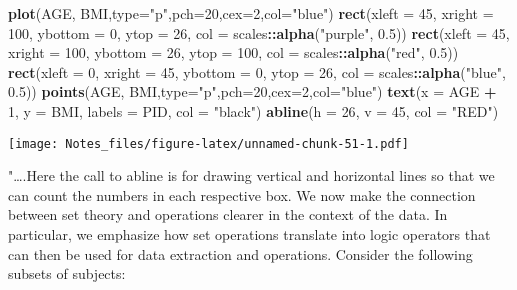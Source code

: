 \documentclass[]{article}
\newenvironment{Shaded}{\begin{snugshade}}{\end{snugshade}}
\newcommand{\DataTypeTok}[1]{\textcolor[rgb]{0.13,0.29,0.53}{#1}}
\newcommand{\DecValTok}[1]{\textcolor[rgb]{0.00,0.00,0.81}{#1}}
\newcommand{\FloatTok}[1]{\textcolor[rgb]{0.00,0.00,0.81}{#1}}
\newcommand{\KeywordTok}[1]{\textcolor[rgb]{0.13,0.29,0.53}{\textbf{#1}}}
\newcommand{\NormalTok}[1]{#1}
\newcommand{\OperatorTok}[1]{\textcolor[rgb]{0.81,0.36,0.00}{\textbf{#1}}}
\newcommand{\StringTok}[1]{\textcolor[rgb]{0.31,0.60,0.02}{#1}}
\begin{document}
\begin{Shaded}
\begin{Highlighting}[]
\KeywordTok{plot}\NormalTok{(AGE, BMI,}\DataTypeTok{type=}\StringTok{"p"}\NormalTok{,}\DataTypeTok{pch=}\DecValTok{20}\NormalTok{,}\DataTypeTok{cex=}\DecValTok{2}\NormalTok{,}\DataTypeTok{col=}\StringTok{"blue"}\NormalTok{) }
\KeywordTok{rect}\NormalTok{(}\DataTypeTok{xleft =} \DecValTok{45}\NormalTok{, }\DataTypeTok{xright =} \DecValTok{100}\NormalTok{, }\DataTypeTok{ybottom =} \DecValTok{0}\NormalTok{, }\DataTypeTok{ytop =} \DecValTok{26}\NormalTok{, }\DataTypeTok{col =}\NormalTok{ scales}\OperatorTok{::}\KeywordTok{alpha}\NormalTok{(}\StringTok{"purple"}\NormalTok{, }\FloatTok{0.5}\NormalTok{)) }
\KeywordTok{rect}\NormalTok{(}\DataTypeTok{xleft =} \DecValTok{45}\NormalTok{, }\DataTypeTok{xright =} \DecValTok{100}\NormalTok{, }\DataTypeTok{ybottom =} \DecValTok{26}\NormalTok{, }\DataTypeTok{ytop =} \DecValTok{100}\NormalTok{, }\DataTypeTok{col =}\NormalTok{ scales}\OperatorTok{::}\KeywordTok{alpha}\NormalTok{(}\StringTok{"red"}\NormalTok{, }\FloatTok{0.5}\NormalTok{)) }
\KeywordTok{rect}\NormalTok{(}\DataTypeTok{xleft =} \DecValTok{0}\NormalTok{, }\DataTypeTok{xright =} \DecValTok{45}\NormalTok{, }\DataTypeTok{ybottom =} \DecValTok{0}\NormalTok{, }\DataTypeTok{ytop =} \DecValTok{26}\NormalTok{, }\DataTypeTok{col =}\NormalTok{ scales}\OperatorTok{::}\KeywordTok{alpha}\NormalTok{(}\StringTok{"blue"}\NormalTok{, }\FloatTok{0.5}\NormalTok{)) }
\KeywordTok{points}\NormalTok{(AGE, BMI,}\DataTypeTok{type=}\StringTok{"p"}\NormalTok{,}\DataTypeTok{pch=}\DecValTok{20}\NormalTok{,}\DataTypeTok{cex=}\DecValTok{2}\NormalTok{,}\DataTypeTok{col=}\StringTok{"blue"}\NormalTok{) }
\KeywordTok{text}\NormalTok{(}\DataTypeTok{x =}\NormalTok{ AGE }\OperatorTok{+}\StringTok{ }\DecValTok{1}\NormalTok{, }\DataTypeTok{y =}\NormalTok{ BMI, }\DataTypeTok{labels =}\NormalTok{ PID, }\DataTypeTok{col =} \StringTok{"black"}\NormalTok{) }
\KeywordTok{abline}\NormalTok{(}\DataTypeTok{h =} \DecValTok{26}\NormalTok{, }\DataTypeTok{v =} \DecValTok{45}\NormalTok{, }\DataTypeTok{col =} \StringTok{"RED"}\NormalTok{)}
\end{Highlighting}
\end{Shaded}

\texttt{[image: Notes\_files/figure-latex/unnamed-chunk-51-1.pdf]}

"\ldots{}.Here the call to abline is for drawing vertical and horizontal
lines so that we can count the numbers in each respective box. We now
make the connection between set theory and operations clearer in the
context of the data. In particular, we emphasize how set operations
translate into logic operators that can then be used for data extraction
and operations. Consider the following subsets of subjects:
\end{document}
